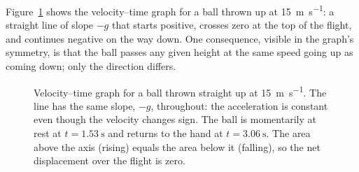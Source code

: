 \documentclass[11pt,twoside,openany]{book}
\newcommand{\dd}{\mathrm{d}}
\begin{document}
Figure~\ref{fig:thrown} shows the velocity--time graph for a ball thrown up at \SI{15}{\metre\per\second}: a straight line of slope $-g$ that starts positive, crosses zero at the top of the flight, and continues negative on the way down. One consequence, visible in the graph's symmetry, is that the ball passes any given height at the same speed going up as coming down; only the direction differs.

\begin{figure}[htb]
\centering
{}
\caption{Velocity--time graph for a ball thrown straight up at \SI{15}{\metre\per\second}. The line has the same slope, $-g$, throughout: the acceleration is constant even though the velocity changes sign. The ball is momentarily at rest at $t = \SI{1.53}{\second}$ and returns to the hand at $t = \SI{3.06}{\second}$. The area above the axis (rising) equals the area below it (falling), so the net displacement over the flight is zero.}
\label{fig:thrown}
\end{figure}
\end{document}
